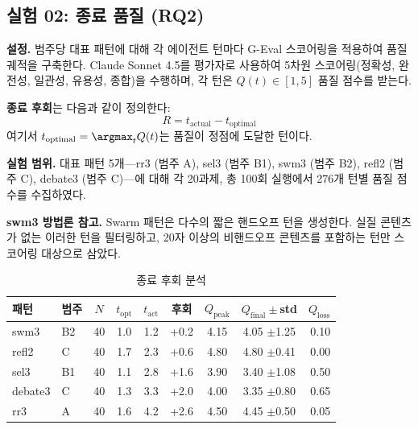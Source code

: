 \subsection{실험 02: 종료 품질 (RQ2)}
\label{sec:exp02}

\textbf{설정.} 범주당 대표 패턴에 대해 각 에이전트 턴마다 G-Eval 스코어링을 적용하여 품질 궤적을 구축한다. Claude Sonnet 4.5를 평가자로 사용하여 5차원 스코어링(정확성, 완전성, 일관성, 유용성, 종합)을 수행하며, 각 턴은 $Q(t) \in [1, 5]$ 품질 점수를 받는다.

\textbf{종료 후회}는 다음과 같이 정의한다:
\begin{equation}
R = t_{\text{actual}} - t_{\text{optimal}}
\end{equation}
여기서 $t_{\text{optimal}} = \argmax_t Q(t)$는 품질이 정점에 도달한 턴이다.

\textbf{실험 범위.} 대표 패턴 5개---rr3 (범주 A), sel3 (범주 B1), swm3 (범주 B2), refl2 (범주 C), debate3 (범주 C)---에 대해 각 20과제, 총 100회 실행에서 276개 턴별 품질 점수를 수집하였다.

\textbf{swm3 방법론 참고.} Swarm 패턴은 다수의 짧은 핸드오프 턴을 생성한다. 실질 콘텐츠가 없는 이러한 턴을 필터링하고, 20자 이상의 비핸드오프 콘텐츠를 포함하는 턴만 스코어링 대상으로 삼았다.

\begin{table}[H]
\centering
\caption{종료 후회 분석}
\label{tab:termination-regret}
{\small
\begin{tabular}{llccccccr}
\toprule
패턴 & 범주 & $N$ & $t_{\text{opt}}$ & $t_{\text{act}}$ & 후회 & $Q_{\text{peak}}$ & $Q_{\text{final}} \pm$std & $Q_{\text{loss}}$ \\
\midrule
swm3    & B2 & 40 & 1.0 & 1.2 & +0.2 & 4.15 & 4.05 $\pm$1.25 & 0.10 \\
refl2   & C  & 40 & 1.7 & 2.3 & +0.6 & 4.80 & 4.80 $\pm$0.41 & 0.00 \\
sel3    & B1 & 40 & 1.1 & 2.8 & +1.6 & 3.90 & 3.40 $\pm$1.08 & 0.50 \\
debate3 & C  & 40 & 1.3 & 3.3 & +2.0 & 4.00 & 3.35 $\pm$0.80 & 0.65 \\
rr3     & A  & 40 & 1.6 & 4.2 & +2.6 & 4.50 & 4.45 $\pm$0.50 & 0.05 \\
\bottomrule
\end{tabular}
}
\end{table}


